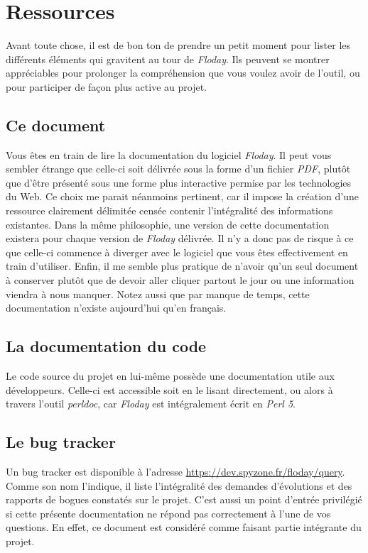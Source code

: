 \section{Ressources}
\begin{intro}
Avant toute chose, il est de bon ton de prendre un petit moment pour lister les différents éléments qui gravitent au tour de \emph{Floday}.
Ils peuvent se montrer appréciables pour prolonger la compréhension que vous voulez avoir de l'outil, ou pour participer de façon plus active au projet.
\end{intro}

\subsection{Ce document}
Vous êtes en train de lire la documentation du logiciel \emph{Floday}.
Il peut vous sembler étrange que celle-ci soit délivrée sous la forme d'un fichier \emph{PDF}, plutôt que d'être présenté sous une forme plus interactive permise par les technologies du Web.
Ce choix me parait néanmoins pertinent, car il impose la création d'une ressource clairement délimitée censée contenir l'intégralité des informations existantes.
Dans la même philosophie, une version de cette documentation existera pour chaque version de \emph{Floday} délivrée. Il n'y a donc pas de risque à ce que celle-ci commence à diverger avec le logiciel que vous êtes effectivement en train d'utiliser.
Enfin, il me semble plus pratique de n'avoir qu'un seul document à conserver plutôt que de devoir aller cliquer partout le jour ou une information viendra à nous manquer.
Notez aussi que par manque de temps, cette documentation n'existe aujourd'hui qu'en français.

\subsection{La documentation du code}
Le code source du projet en lui-même possède une documentation utile aux développeurs.
Celle-ci est accessible soit en le lisant directement, ou alors à travers l'outil \emph{perldoc}, car \emph{Floday} est intégralement écrit en \emph{Perl 5}.

\subsection{Le bug tracker}
Un bug tracker est disponible à l'adresse \url{https://dev.spyzone.fr/floday/query}.
Comme son nom l'indique, il liste l'intégralité des demandes d'évolutions et des rapports de bogues constatés sur le projet.
C'est aussi un point d'entrée privilégié si cette présente documentation ne répond pas correctement à l'une de vos questions.
En effet, ce document est considéré comme faisant partie intégrante du projet.

